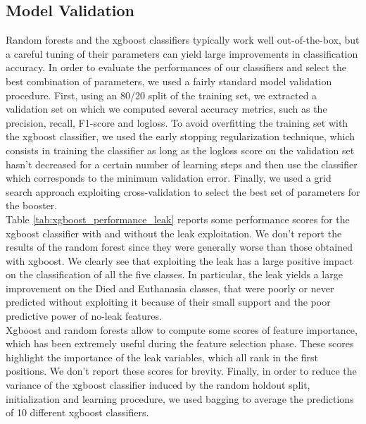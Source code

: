 \documentclass[a4paper,11pt]{article}
\begin{document}
\subsection{Model Validation}
Random forests and the xgboost classifiers typically work well out-of-the-box, but a careful tuning of their parameters can yield large improvements in classification accuracy. In order to evaluate the performances of our classifiers and select the best combination of parameters, we used a fairly standard model validation procedure. First, using an 80/20 split of the training set, we extracted a validation set on which we computed several accuracy metrics, such as the precision, recall, F1-score and logloss. To avoid overfitting the training set with the xgboost classifier, we used the early stopping regularization technique, which consists in training the classifier as long as the logloss score on the validation set hasn't decreased for a certain number of learning steps and then use the classifier which corresponds to the minimum validation error. Finally, we used a grid search approach exploiting cross-validation to select the best set of parameters for the booster.\\
Table \ref{tab:xgboost_performance_leak} reports some performance scores for the xgboost classifier with and without the leak exploitation. We don't report the results of the random forest since they were generally worse than those obtained with xgboost. We clearly see that exploiting the leak has a large positive impact on the classification of all the five classes. In particular, the leak yields a large improvement on the Died and Euthanasia classes, that were poorly or never predicted without exploiting it because of their small support and the poor predictive power of no-leak features.\\
Xgboost and random forests allow to compute some scores of feature importance, which has been extremely useful during the feature selection phase. These scores highlight the importance of the leak variables, which all rank in the first positions. We don't report these scores for brevity. Finally, in order to reduce the variance of the xgboost classifier induced by the random holdout split, initialization and learning procedure, we used bagging to average the predictions of 10 different xgboost classifiers.
\end{document}
